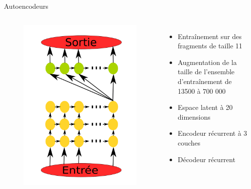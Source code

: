 \documentclass{beamer}
\begin{document}
\begin{frame}{Autoencodeurs}

  \begin{columns}
    \begin{figure}
      \centering
      \includegraphics[scale=0.17]{../Figures/EncoDeco}
    \end{figure}

    \begin{itemize}
    \item Entraînement sur des fragments de taille 11
    \item Augmentation de la taille de l'ensemble d'entraînement de 13500 à 700
      000
    \item Espace latent à 20 dimensions
    \item Encodeur récurrent à 3 couches
    \item Décodeur récurrent
    \end{itemize}
  \end{columns}
  
\end{frame}
\end{document}
